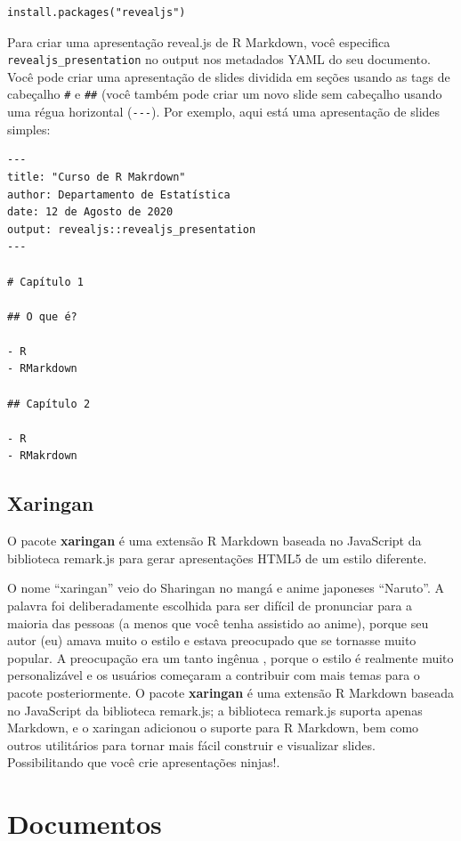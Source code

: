 \documentclass[
]{book}
\begin{document}
\begin{verbatim}
install.packages("revealjs")
\end{verbatim}

Para criar uma apresentação reveal.js de R Markdown, você especifica \texttt{revealjs\_presentation} no output nos metadados YAML do seu documento. Você pode criar uma apresentação de slides dividida em seções usando as tags de cabeçalho \texttt{\#} e \texttt{\#\#} (você também pode criar um novo slide sem cabeçalho usando uma régua horizontal (\texttt{-\/-\/-}). Por exemplo, aqui está uma apresentação de slides simples:

\begin{verbatim}
---
title: "Curso de R Makrdown"
author: Departamento de Estatística
date: 12 de Agosto de 2020
output: revealjs::revealjs_presentation
---

# Capítulo 1

## O que é?

- R
- RMarkdown

## Capítulo 2

- R
- RMakrdown
\end{verbatim}

\hypertarget{xaringan}{%
\subsection{Xaringan}\label{xaringan}}

O pacote \textbf{xaringan} é uma extensão R Markdown baseada no JavaScript da biblioteca remark.js para gerar apresentações HTML5 de um estilo diferente.

O nome ``xaringan'' veio do Sharingan no mangá e anime japoneses ``Naruto''. A palavra foi deliberadamente escolhida para ser difícil de pronunciar para a maioria das pessoas (a menos que você tenha assistido ao anime), porque seu autor (eu) amava muito o estilo e estava preocupado que se tornasse muito popular. A preocupação era um tanto ingênua , porque o estilo é realmente muito personalizável e os usuários começaram a contribuir com mais temas para o pacote posteriormente.
O pacote \textbf{xaringan} é uma extensão R Markdown baseada no JavaScript da biblioteca remark.js; a biblioteca remark.js suporta apenas Markdown, e o xaringan adicionou o suporte para R Markdown, bem como outros utilitários para tornar mais fácil construir e visualizar slides. Possibilitando que você crie apresentações ninjas!.

\hypertarget{documentos}{%
\section{Documentos}\label{documentos}}
\end{document}
